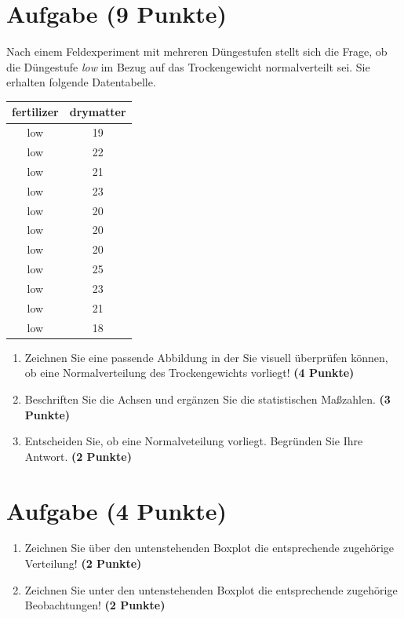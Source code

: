 \documentclass[a4paper, 10pt]{scrartcl}\usepackage[]{graphicx}\usepackage[]{xcolor}
\begin{document}
\section{Aufgabe \hfill (9 Punkte)}

Nach einem Feldexperiment mit mehreren D{\"u}ngestufen stellt sich die Frage,
ob die D{\"u}ngestufe \textit{low} im Bezug auf das Trockengewicht
normalverteilt sei. Sie erhalten folgende Datentabelle.

\begin{table}[!h]
\centering
\begin{tabular}{cc}
\toprule
fertilizer & drymatter\\
\midrule
low & 19\\
low & 22\\
low & 21\\
low & 23\\
low & 20\\
\addlinespace
low & 20\\
low & 20\\
low & 25\\
low & 23\\
low & 21\\
\addlinespace
low & 18\\
\bottomrule
\end{tabular}
\end{table}



\begin{enumerate}
\item Zeichnen Sie eine passende Abbildung in der Sie visuell {\"u}berpr{\"u}fen
  k{\"o}nnen, ob eine Normalverteilung des Trockengewichts vorliegt! \textbf{(4
    Punkte)}
\item Beschriften Sie die Achsen und erg{\"a}nzen Sie die statistischen
  Ma{\ss}zahlen. \textbf{(3 Punkte)}
\item Entscheiden Sie, ob eine Normalveteilung vorliegt. Begr{\"u}nden Sie Ihre
  Antwort. \textbf{(2 Punkte)}
\end{enumerate} 
\clearpage

\section{Aufgabe \hfill (4 Punkte)}



\begin{enumerate}
\item Zeichnen Sie {\"u}ber den untenstehenden Boxplot die entsprechende
  zugeh{\"o}rige Verteilung! \textbf{(2 Punkte)} 
\item Zeichnen Sie unter den untenstehenden Boxplot die entsprechende
  zugeh{\"o}rige Beobachtungen! \textbf{(2 Punkte)}
\end{enumerate}
\end{document}
